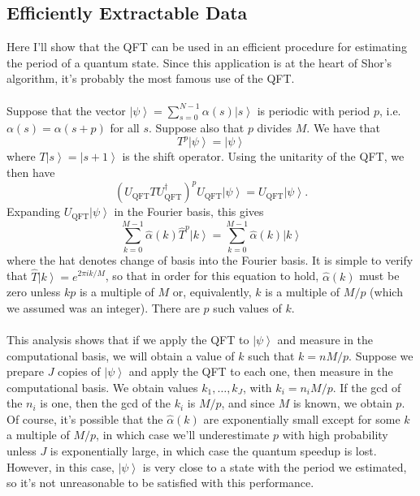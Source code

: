\documentclass[]{article}
\begin{document}
\subsection*{Efficiently Extractable Data}
Here I'll show that the QFT can be used in an efficient procedure for estimating the period of a quantum state. Since this application is at the heart of Shor's algorithm, it's probably the most famous use of the QFT.\\
\\
Suppose that the vector $\left\vert\psi\right\rangle=\sum_{s=0}^{N-1}\alpha(s)\left\vert s\right\rangle$ is periodic with period $p$, i.e. $\alpha(s)=\alpha(s+p)$ for all $s$. Suppose also that $p$ divides $M$. We have that
\begin{equation}
T^p\left\vert\psi\right\rangle=\left\vert\psi\right\rangle
\end{equation}
where $T\left\vert s\right\rangle=\left\vert s+1\right\rangle$ is the shift operator. Using the unitarity of the QFT, we then have
\begin{equation}
\left(U_\text{QFT}TU_\text{QFT}^\dagger\right)^pU_\text{QFT}\left\vert\psi\right\rangle=U_\text{QFT}\left\vert\psi\right\rangle.
\end{equation}
Expanding $U_\text{QFT}\left\vert\psi\right\rangle$ in the Fourier basis, this gives
\begin{equation}
\sum_{k=0}^{M-1}\hat{\alpha}(k)\hat{T}^p\left\vert k\right\rangle=\sum_{k=0}^{M-1}\hat{\alpha}(k)\left\vert k\right\rangle
\end{equation}
where the hat denotes change of basis into the Fourier basis. It is simple to verify that $\hat{T}\left\vert k\right\rangle=e^{2\pi ik/M}$, so that in order for this equation to hold, $\hat{\alpha}(k)$ must be zero unless $kp$ is a multiple of $M$ or, equivalently, $k$ is a multiple of $M/p$ (which we assumed was an integer). There are  $p$ such values of $k$.\\
\\
This analysis shows that if we apply the QFT to $\left\vert\psi\right\rangle$ and measure in the computational basis, we will obtain a value of $k$ such that $k=nM/p$. Suppose we prepare $J$ copies of $\left\vert\psi\right\rangle$ and apply the QFT to each one, then measure in the computational basis. We obtain values $k_1,\ldots,k_J$, with $k_i=n_iM/p$. If the gcd of the $n_i$ is one, then the gcd of the $k_i$ is $M/p$, and since $M$ is known, we obtain $p$. Of course, it's possible that the $\hat{\alpha}(k)$ are exponentially small except for some $k$ a multiple of $M/p$, in which case we'll underestimate $p$ with high probability unless $J$ is exponentially large, in which case the quantum speedup is lost. However, in this case, $\left\vert\psi\right\rangle$ is very close to a state with the period we estimated, so it's not unreasonable to be satisfied with this performance.\\
\end{document}
